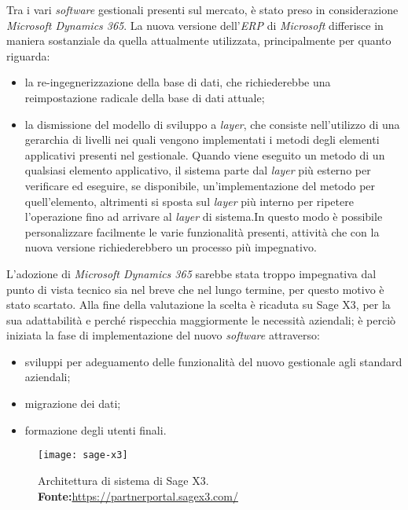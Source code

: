 Tra i vari \textit{software} gestionali presenti sul mercato, è stato preso in considerazione \textit{Microsoft Dynamics 365}. La nuova versione dell'\textit{ERP} di \textit{Microsoft} differisce in maniera sostanziale da quella attualmente utilizzata, principalmente per quanto riguarda:
\begin{itemize}
	\item la re-ingegnerizzazione della base di dati, che richiederebbe una reimpostazione radicale della base di dati attuale;
	\item la dismissione del modello di sviluppo a \textit{layer}, che consiste nell'utilizzo di una gerarchia di livelli nei quali vengono implementati i metodi degli elementi applicativi presenti nel gestionale. Quando viene eseguito un metodo di un qualsiasi elemento applicativo, il sistema parte dal \textit{layer} più esterno per verificare ed eseguire, se disponibile, un'implementazione del metodo per quell'elemento, altrimenti si sposta sul \textit{layer} più interno per ripetere l'operazione fino ad arrivare al \textit{layer} di sistema.In questo modo è possibile personalizzare facilmente le varie funzionalità presenti, attività che con la nuova versione richiederebbero un processo più impegnativo.
\end{itemize}
L'adozione di \textit{Microsoft Dynamics 365} sarebbe stata troppo impegnativa dal punto di vista tecnico sia nel breve che nel lungo termine, per questo motivo è stato scartato.
Alla fine della valutazione la scelta è ricaduta su Sage X3, per la sua adattabilità e perché rispecchia maggiormente le necessità aziendali; è perciò iniziata la fase di implementazione del nuovo \textit{software} attraverso:

\begin{itemize}
	\item sviluppi per adeguamento delle funzionalità del nuovo gestionale agli standard aziendali;
	\item migrazione dei dati;
	\item formazione degli utenti finali.
\end{itemize}


\vspace{10pt}
\begin{figure}[htbp]
	\begin{center}
		\texttt{[image: sage-x3]}
		\caption{Architettura di sistema di Sage X3. \newline \textbf{Fonte:}\url{https://partnerportal.sagex3.com/}}
	\end{center}
\end{figure}
\vspace{30pt}


